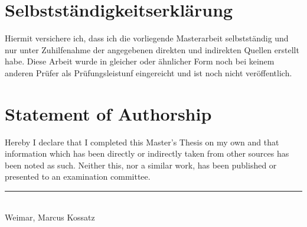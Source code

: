 
\section*{Selbstständigkeitserklärung}

\vspace{1em}

Hiermit versichere ich, dass ich die vorliegende Masterarbeit selbstständig und nur unter Zuhilfenahme der angegebenen direkten und indirekten Quellen erstellt habe. Diese Arbeit wurde in gleicher oder ähnlicher Form noch bei keinem anderen Prüfer als Prüfungsleistunf eingereicht und ist noch nicht veröffentlich.

\vspace{3em}

\section*{Statement of Authorship}

\vspace{1em}

Hereby I declare that I completed this Master's Thesis on my own and that information which has been directly or indirectly taken from other sources has been noted as such. Neither this, nor a similar work, has been published or presented to an examination committee.

\vspace{5em}

\hfill \rule{120px}{0.5px} \\
Weimar, \submissionDate \hfill Marcus Kossatz

\newpage